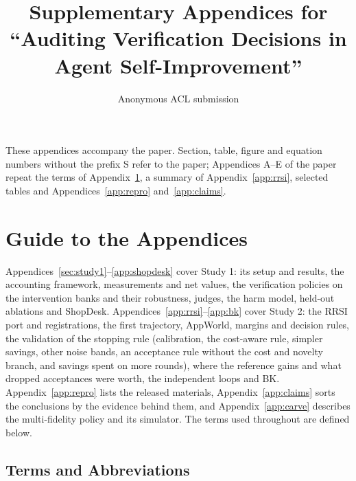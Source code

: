 \documentclass[11pt]{article}
\title{Supplementary Appendices for\\``Auditing Verification Decisions in Agent Self-Improvement''}
\author{Anonymous ACL submission}
\begin{document}
\maketitle

These appendices accompany the paper. Section, table, figure and equation numbers without the prefix S refer to the paper; Appendices A--E of the paper repeat the terms of Appendix~\ref{app:guide}, a summary of Appendix~\ref{app:rrsi}, selected tables and Appendices~\ref{app:repro} and~\ref{app:claims}.


\section{Guide to the Appendices}
\label{app:guide}
Appendices~\ref{sec:study1}--\ref{app:shopdesk} cover Study 1: its setup and results, the accounting framework, measurements and net values, the verification policies on the intervention banks and their robustness, judges, the harm model, held-out ablations and ShopDesk. Appendices~\ref{app:rrsi}--\ref{app:bk} cover Study 2: the RRSI port and registrations, the first trajectory, AppWorld, margins and decision rules, the validation of the stopping rule (calibration, the cost-aware rule, simpler savings, other noise bands, an acceptance rule without the cost and novelty branch, and savings spent on more rounds), where the reference gains and what dropped acceptances were worth, the independent loops and BK. Appendix~\ref{app:repro} lists the released materials, Appendix~\ref{app:claims} sorts the conclusions by the evidence behind them, and Appendix~\ref{app:carve} describes the multi-fidelity policy and its simulator. The terms used throughout are defined below.

\subsection*{Terms and Abbreviations}
\label{app:terms}
\end{document}
